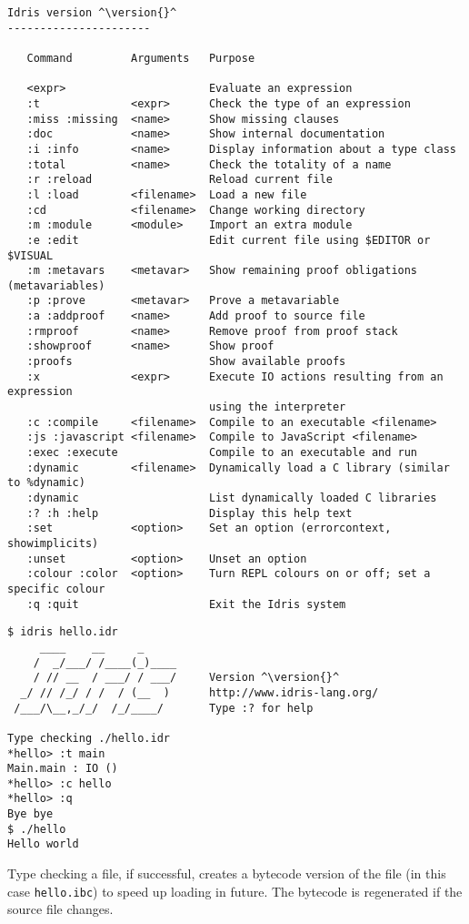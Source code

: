 \begin{lstlisting}[caption={Interactive environment commands}, label=cmds, style=stdout, float=htp]
Idris version ^\version{}^
----------------------

   Command         Arguments   Purpose
                               
   <expr>                      Evaluate an expression
   :t              <expr>      Check the type of an expression
   :miss :missing  <name>      Show missing clauses
   :doc            <name>      Show internal documentation
   :i :info        <name>      Display information about a type class
   :total          <name>      Check the totality of a name
   :r :reload                  Reload current file
   :l :load        <filename>  Load a new file
   :cd             <filename>  Change working directory
   :m :module      <module>    Import an extra module
   :e :edit                    Edit current file using $EDITOR or $VISUAL
   :m :metavars    <metavar>   Show remaining proof obligations (metavariables)
   :p :prove       <metavar>   Prove a metavariable
   :a :addproof    <name>      Add proof to source file
   :rmproof        <name>      Remove proof from proof stack
   :showproof      <name>      Show proof
   :proofs                     Show available proofs
   :x              <expr>      Execute IO actions resulting from an expression 
                               using the interpreter
   :c :compile     <filename>  Compile to an executable <filename>
   :js :javascript <filename>  Compile to JavaScript <filename>
   :exec :execute              Compile to an executable and run
   :dynamic        <filename>  Dynamically load a C library (similar to %dynamic)
   :dynamic                    List dynamically loaded C libraries
   :? :h :help                 Display this help text
   :set            <option>    Set an option (errorcontext, showimplicits)
   :unset          <option>    Unset an option
   :colour :color  <option>    Turn REPL colours on or off; set a specific colour
   :q :quit                    Exit the Idris system
\end{lstlisting}

\begin{lstlisting}[caption={Sample Interactive Run}, label=run1, style=stdout, float=htp]
$ idris hello.idr
     ____    __     _                                          
    /  _/___/ /____(_)____                                     
    / // __  / ___/ / ___/     Version ^\version{}^
  _/ // /_/ / /  / (__  )      http://www.idris-lang.org/      
 /___/\__,_/_/  /_/____/       Type :? for help        

Type checking ./hello.idr
*hello> :t main 
Main.main : IO ()
*hello> :c hello 
*hello> :q 
Bye bye
$ ./hello 
Hello world
\end{lstlisting}

\noindent
Type checking a file, if successful, creates a bytecode version of the file (in this case \texttt{hello.ibc}) to speed up loading in future.
The bytecode is regenerated if the source file changes.

